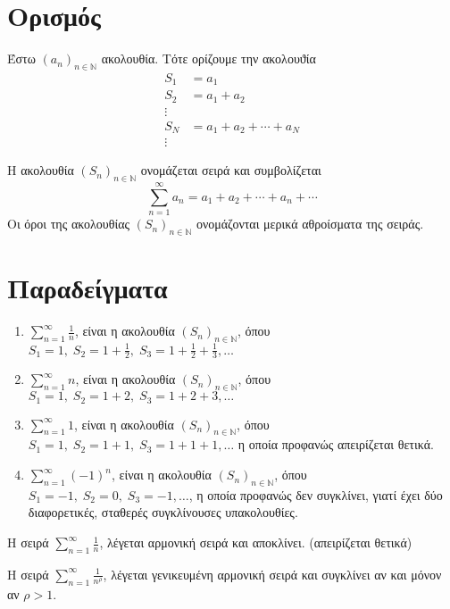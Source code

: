 \documentclass[main.tex]{subfiles}
\begin{document}
\section{Ορισμός}


Έστω $ {(a_{n})}_{n \in \mathbb{N}}$ ακολουθία. Τότε ορίζουμε την ακολουϑία 
\begin{align*}
    S_{1} &= a_{1} \\
    S_{2} &= a_{1}+ a_{2} \\
    \vdots \\
    S_{N} &= a_{1}+ a_{2}+ \cdots + a_{N} \\
    \vdots 
\end{align*}

Η ακολουθία $ {(S_{n})}_{n \in \mathbb{N}} $ ονομάζεται σειρά και συμβολίζεται
\[
    \sum_{n=1}^{\infty} a_{n} = a_{1}+ a_{2}+ \cdots + a_{n} + \cdots   
\] 
Οι όροι της ακολουθίας $ {(S_{n})}_{n \in \mathbb{N}} $ ονομάζονται μερικά αθροίσματα 
της σειράς.

\section{Παραδείγματα}

\begin{enumerate}
    \item $ \sum_{n=1}^{\infty} \frac{1}{n} $, είναι η ακολουθία 
        $ {(S_{n})}_{n \in \mathbb{N}} $, όπου $ S_{1}=1, \; S_{2}=1+ \frac{1}{2}, \; 
        S_{3}= 1 + \frac{1}{2} + \frac{1}{3}, \ldots  $

    \item $ \sum_{n=1}^{\infty} n  $, είναι η ακολουθία ${(S_{n})}_{n \in \mathbb{N}}$,
        όπου $ S_{1}=1, \; S_{2}=1+2, \; S_{3}=1+2+3, \ldots $

    \item $ \sum_{n=1}^{\infty} 1  $, είναι η ακολουθία ${(S_{n})}_{n \in \mathbb{N}}$,
        όπου $ S_{1}=1, \; S_{2}=1+1, \; S_{3}=1+1+1, \ldots $ η οποία προφανώς 
        απειρίζεται θετικά.

    \item $ \sum_{n=1}^{\infty} {(-1)}^{n}  $, είναι η ακολουθία 
        $ {(S_{n})}_{n \in \mathbb{N}} $, όπου $ S_{1}=-1, \; S_{2}=0, \; S_{3}=-1, 
        \ldots $, η οποία προφανώς δεν συγκλίνει, γιατί έχει δύο διαφορετικές, σταθερές 
        συγκλίνουσες υπακολουθίες.
\end{enumerate}

\begin{rems}
\item {}
    \begin{myitemize}
    \item Η σειρά $ \sum_{n=1}^{\infty} \frac{1}{n}  $, λέγεται αρμονική σειρά 
        και αποκλίνει. (απειρίζεται θετικά)
    \item Η σειρά $ \sum_{n=1}^{\infty} \frac{1}{n^{\rho}}  $, λέγεται γενικευμένη 
        αρμονική σειρά και συγκλίνει αν και μόνον αν $ \rho > 1 $.
    \end{myitemize}
\end{rems}
\end{document}
